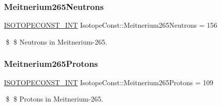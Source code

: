 \subsubsection{\texorpdfstring{Meitnerium265\+Neutrons}{Meitnerium265Neutrons}}
{\footnotesize\ttfamily \mbox{\hyperlink{group___isotope_const-_macros_ga5f18360b3e99483a35c32d789e62621c}{I\+S\+O\+T\+O\+P\+E\+C\+O\+N\+S\+T\+\_\+\+I\+NT}} Isotope\+Const\+::\+Meitnerium265\+Neutrons = 156}

\$ \$ Neutrons in Meitnerium-\/265. \mbox{\label{group___isotope_const-_meitnerium-_mt265_ga5390e7d3dfa7b6b267d838ff39874365}} 
\subsubsection{\texorpdfstring{Meitnerium265\+Protons}{Meitnerium265Protons}}
{\footnotesize\ttfamily \mbox{\hyperlink{group___isotope_const-_macros_ga5f18360b3e99483a35c32d789e62621c}{I\+S\+O\+T\+O\+P\+E\+C\+O\+N\+S\+T\+\_\+\+I\+NT}} Isotope\+Const\+::\+Meitnerium265\+Protons = 109}

\$ \$ Protons in Meitnerium-\/265. 